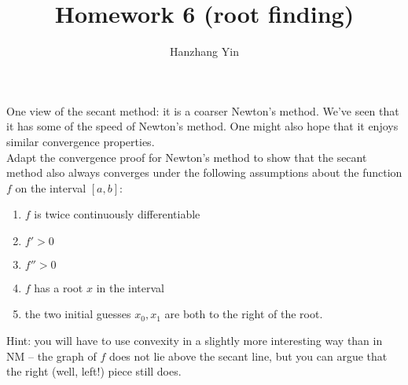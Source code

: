 \documentclass{article}
\title{\vspace{-4em}Homework 6 (root finding)}
\author{Hanzhang Yin}
\begin{document}
\maketitle

\begin{problem}
    One view of the secant method: it is a coarser Newton's method. We've seen that it has some of the speed of Newton's method. One might also hope that it enjoys similar convergence properties.\\[-0.5em]
    
    Adapt the convergence proof for Newton's method to show that the secant method also always converges under the following assumptions about the function \(f\) on the interval \([a,b]\):
    \begin{enumerate}[\hspace{2em} i)]
        \item \(f\) is twice continuously differentiable
        \item \(f' > 0\)
        \item \(f''> 0\)
        \item \(f\) has a root \(x\) in the interval
        \item the two initial guesses \(x_0,x_1\) are both to the right of the root.
    \end{enumerate}

    Hint: you will have to use convexity in a slightly more interesting way than in NM -- the graph of \(f\) does not lie above the secant line, but you can argue that the right (well, left!) piece still does.
\end{problem}
\end{document}
